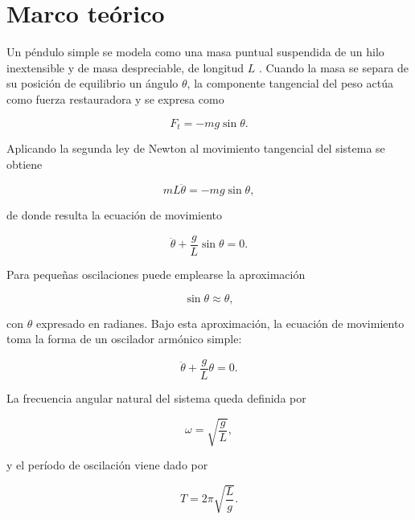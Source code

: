 \section{Marco teórico}

Un péndulo simple se modela como una masa puntual suspendida de un hilo inextensible y de masa despreciable, de longitud $L$ \cite{young2018}. Cuando la masa se separa de su posición de equilibrio un ángulo $\theta$, la componente tangencial del peso actúa como fuerza restauradora y se expresa como

\begin{equation}
F_t=-mg\sin\theta.
\label{eq:fuerza_restauradora}
\end{equation}

Aplicando la segunda ley de Newton al movimiento tangencial del sistema se obtiene

\begin{equation}
mL\ddot{\theta}=-mg\sin\theta,
\label{eq:segunda_ley_pendulo}
\end{equation}

de donde resulta la ecuación de movimiento

\begin{equation}
\ddot{\theta}+\frac{g}{L}\sin\theta=0.
\label{eq:movimiento_pendulo}
\end{equation}

Para pequeñas oscilaciones puede emplearse la aproximación

\begin{equation}
\sin\theta\approx\theta,
\label{eq:aproximacion_angular}
\end{equation}

con $\theta$ expresado en radianes. Bajo esta aproximación, la ecuación de movimiento toma la forma de un oscilador armónico simple:

\begin{equation}
\ddot{\theta}+\frac{g}{L}\theta=0.
\label{eq:oas_pendulo}
\end{equation}

La frecuencia angular natural del sistema queda definida por

\begin{equation}
\omega=\sqrt{\frac{g}{L}},
\label{eq:frecuencia_angular}
\end{equation}

y el período de oscilación viene dado por

\begin{equation}
T=2\pi\sqrt{\frac{L}{g}}.
\label{eq:periodo_pendulo}
\end{equation}

